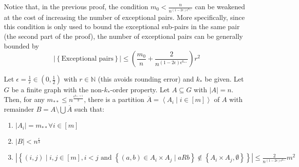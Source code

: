     \remark[Remark 4.15]
        Notice that, in the previous proof, the condition $m_0 < \frac{n}{n^{(1-2\epsilon)\epsilon^{k_{**}}}}$ can be
            weakened at the cost of increasing the number of exceptional pairs.
        More specifically, since this condition is only used to bound the exceptional sub-pairs in the same pair
            (the second part of the proof), the number of exceptional pairs can be generally bounded by
            \[
                |\left\{ \text{Exceptional pairs} \right\}|
                    \leq \left( \frac{m_0}{n} + \frac{2}{n^{(1-2\epsilon)\epsilon^{k_{**}}}} \right) r^2
            \]

    \theorem[Theorem 4.16]
        Let $\epsilon = \frac{1}{r} \in \left( 0, \frac{1}{2} \right)$ with $r \in \mathbb{N}$ (this avoids rounding error)
            and $k_*$ be given.
        Let $G$ be a finite graph with the non-$k_*$-order property.
        Let $A \subseteq G$ with $|A| = n$.
        Then, for any $m_{**} \leq n^{\frac{\epsilon^{k_{**}+1}}{3}}$, there is a partition
            $\overline{A} = \left< A_i \mid i \in [m] \right>$ of $A$ with remainder $B = A \setminus \bigcup \overline{A}$
            such that:
        \begin{enumerate}
            \item\label{itm:4.16.1} $|A_i| = m_{**} \forall i \in [m]$
            \item\label{itm:4.16.2} $|B| < n^{\frac{\epsilon}{3}}$
            \item\label{itm:4.16.3} $|\left\{ (i,j) \mid i,j \in [m], i < j \text{ and }
                \left\{ (a,b) \in A_i \times A_j \mid a R b \right\} \notin
                \left\{ A_i \times A_j, \emptyset \right\} \right\}|
                \leq \frac{2}{n^{(1-2\epsilon)\epsilon^{k_{**}}}} m^2$
        \end{enumerate}
